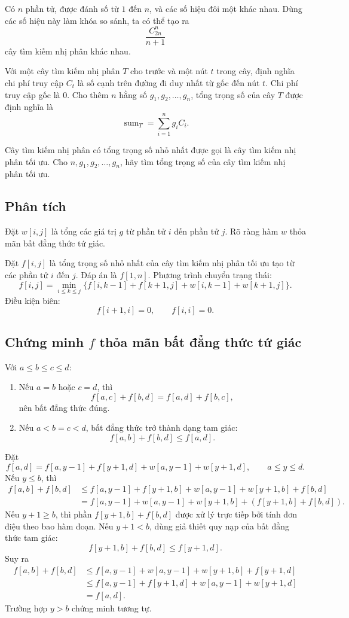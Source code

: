 \documentclass[11pt]{article}
\begin{document}
Có $n$ phần tử, được đánh số từ $1$ đến $n$, và các số hiệu đôi một khác
nhau. Dùng các số hiệu này làm khóa so sánh, ta có thể tạo ra
\[
  \frac{C_{2n}^{n}}{n+1}
\]
cây tìm kiếm nhị phân khác nhau.

Với một cây tìm kiếm nhị phân $T$ cho trước và một nút $t$ trong cây, định
nghĩa chi phí truy cập $C_t$ là số cạnh trên đường đi duy nhất từ gốc đến
nút $t$. Chi phí truy cập gốc là $0$. Cho thêm $n$ hằng số
$g_1,g_2,\ldots,g_n$, tổng trọng số của cây $T$ được định nghĩa là
\[
  \operatorname{sum}_T=\sum_{i=1}^{n} g_i C_i.
\]

Cây tìm kiếm nhị phân có tổng trọng số nhỏ nhất được gọi là cây tìm kiếm nhị
phân tối ưu. Cho $n,g_1,g_2,\ldots,g_n$, hãy tìm tổng trọng số của cây tìm
kiếm nhị phân tối ưu.

\subsection*{Phân tích}

Đặt $w[i,j]$ là tổng các giá trị $g$ từ phần tử $i$ đến phần tử $j$. Rõ ràng
hàm $w$ thỏa mãn bất đẳng thức tứ giác.

Đặt $f[i,j]$ là tổng trọng số nhỏ nhất của cây tìm kiếm nhị phân tối ưu tạo
từ các phần tử $i$ đến $j$. Đáp án là $f[1,n]$. Phương trình chuyển trạng
thái:
\[
  f[i,j]=\min_{i\le k\le j}
  \{f[i,k-1]+f[k+1,j]+w[i,k-1]+w[k+1,j]\}.
\]
Điều kiện biên:
\[
  f[i+1,i]=0,\qquad f[i,i]=0.
\]

\subsection*{Chứng minh $f$ thỏa mãn bất đẳng thức tứ giác}

Với $a\le b\le c\le d$:
\begin{enumerate}
  \item Nếu $a=b$ hoặc $c=d$, thì
  \[
    f[a,c]+f[b,d]=f[a,d]+f[b,c],
  \]
  nên bất đẳng thức đúng.

  \item Nếu $a<b=c<d$, bất đẳng thức trở thành dạng tam giác:
  \[
    f[a,b]+f[b,d]\le f[a,d].
  \]
\end{enumerate}

Đặt
\[
  f[a,d]=f[a,y-1]+f[y+1,d]+w[a,y-1]+w[y+1,d],
  \qquad a\le y\le d.
\]
Nếu $y\le b$, thì
\[
\begin{aligned}
  f[a,b]+f[b,d]
  &\le f[a,y-1]+f[y+1,b]+w[a,y-1]+w[y+1,b]+f[b,d]\\
  &= f[a,y-1]+w[a,y-1]+w[y+1,b]
     +(f[y+1,b]+f[b,d]).
\end{aligned}
\]
Nếu $y+1\ge b$, thì phần $f[y+1,b]+f[b,d]$ được xử lý trực tiếp bởi tính đơn
điệu theo bao hàm đoạn. Nếu $y+1<b$, dùng giả thiết quy nạp của bất đẳng
thức tam giác:
\[
  f[y+1,b]+f[b,d]\le f[y+1,d].
\]
Suy ra
\[
\begin{aligned}
  f[a,b]+f[b,d]
  &\le f[a,y-1]+w[a,y-1]+w[y+1,b]+f[y+1,d]\\
  &\le f[a,y-1]+f[y+1,d]+w[a,y-1]+w[y+1,d]\\
  &=f[a,d].
\end{aligned}
\]
Trường hợp $y>b$ chứng minh tương tự.
\end{document}

